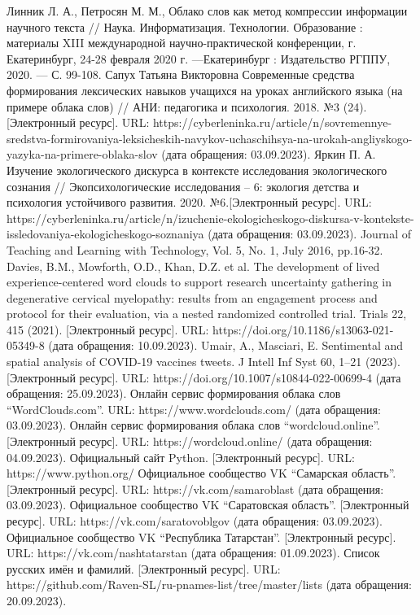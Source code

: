 \documentclass[bachelor, och, coursework ]{SCWorks}
\begin{document}
%
\begin{thebibliography}{99}
  Линник Л. А., Петросян М. М., Облако слов как метод компрессии информации научного текста // Наука. Информатизация. Технологии. Образование : материалы XIII международной научно-практической конференции, г. Екатеринбург, 24-28 февраля 2020 г. ---Екатеринбург : Издательство РГППУ, 2020. --- С. 99-108. 
 Сапух Татьяна Викторовна Современные средства формирования лексических навыков учащихся на уроках английского языка (на примере облака слов) // АНИ: педагогика и психология. 2018. №3 (24).[Электронный ресурс]. URL: https://cyberleninka.ru/article/n/sovremennye-sredstva-formirovaniya-leksicheskih-navykov-uchaschihsya-na-urokah-angliyskogo-yazyka-na-primere-oblaka-slov (дата обращения: 03.09.2023).
 Яркин П. А. Изучение экологического дискурса в контексте исследования экологического сознания // Экопсихологические исследования – 6: экология детства и психология устойчивого развития. 2020. №6.[Электронный ресурс]. URL: https://cyberleninka.ru/article/n/izuchenie-ekologicheskogo-diskursa-v-kontekste-issledovaniya-ekologicheskogo-soznaniya (дата обращения: 03.09.2023).
 Journal of Teaching and Learning with Technology, Vol. 5, No. 1, July 2016, pp.16-32.
 Davies, B.M., Mowforth, O.D., Khan, D.Z. et al. The development of lived experience-centered word clouds to support research uncertainty gathering in degenerative cervical myelopathy: results from an engagement process and protocol for their evaluation, via a nested randomized controlled trial. Trials 22, 415 (2021). [Электронный ресурс]. URL: https://doi.org/10.1186/s13063-021-05349-8 (дата обращения: 10.09.2023).
 Umair, A., Masciari, E. Sentimental and spatial analysis of COVID-19 vaccines tweets. J Intell Inf Syst 60, 1–21 (2023). [Электронный ресурс]. URL: https://doi.org/10.1007/s10844-022-00699-4 (дата обращения: 25.09.2023).
 Онлайн сервис формирования облака слов ``WordClouds.com''.  URL: https://www.wordclouds.com/ (дата обращения: 03.09.2023).
 Онлайн сервис формирования облака слов ``wordcloud.online''. [Электронный ресурс]. URL: https://wordcloud.online/ (дата обращения: 04.09.2023).
 Официальный сайт Python. [Электронный ресурс]. URL: https://www.python.org/
  Официальное сообщество VK ``Самарская область''. [Электронный ресурс]. URL: https://vk.com/samaroblast (дата обращения: 03.09.2023).
  Официальное сообщество VK ``Саратовская область''. [Электронный ресурс]. URL: https://vk.com/saratovoblgov (дата обращения: 03.09.2023).
  Официальное сообщество VK ``Республика Татарстан''. [Электронный ресурс]. URL: https://vk.com/nashtatarstan (дата обращения: 01.09.2023).
 Список русских имён и фамилий. [Электронный ресурс]. URL: https://github.com/Raven-SL/ru-pnames-list/tree/master/lists (дата обращения: 20.09.2023).
\end{thebibliography}
\end{document}
